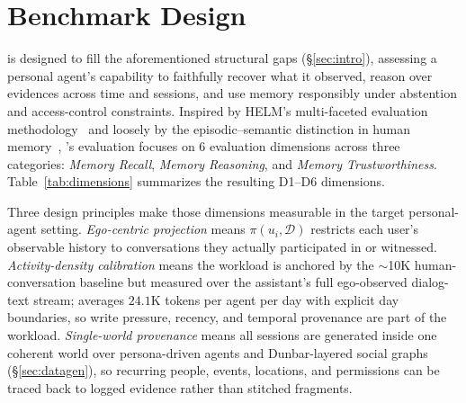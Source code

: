 \section{Benchmark Design \texorpdfstring{\cred{[0.8 pages]}}{[0.8 pages]}}
\label{sec:benchmark}
\benchmark is designed to fill the aforementioned structural gaps (\S\ref{sec:intro}), assessing a personal agent's capability to faithfully recover what it observed, reason over evidences across time and sessions, and use memory responsibly under abstention and access-control constraints.
Inspired by HELM's multi-faceted evaluation methodology~\citep{liang2023helm} and loosely by the episodic--semantic distinction in human memory~\citep{tulving1972episodic}, \benchmark's evaluation focuses on 6 evaluation dimensions across three categories: \emph{Memory Recall}, \emph{Memory Reasoning}, and \emph{Memory Trustworthiness}.
Table~\ref{tab:dimensions} summarizes the resulting D1--D6 dimensions.


Three design principles make those dimensions measurable in the target personal-agent setting. \emph{Ego-centric projection} means $\pi(u_i, \mathcal{D})$ restricts each user's observable history to conversations they actually participated in or witnessed. \emph{Activity-density calibration} means the workload is anchored by the ${\sim}$10K human-conversation baseline but measured over the assistant's full ego-observed dialog-text stream; \benchL averages $24.1$K tokens per agent per day with explicit day boundaries, so write pressure, recency, and temporal provenance are part of the workload. \emph{Single-world provenance} means all sessions are generated inside one coherent \masim world over persona-driven agents and Dunbar-layered social graphs (\S\ref{sec:datagen}), so recurring people, events, locations, and permissions can be traced back to logged evidence rather than stitched fragments.



